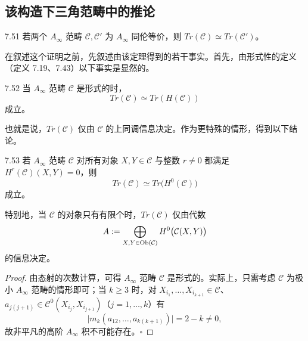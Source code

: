 
\subsection{该构造下三角范畴中的推论}

\begin{theorem}{7.51}
若两个 $A_\infty$ 范畴 $\mathcal C,\mathcal C'$ 为 $A_\infty$ 同伦等价，则 $Tr(\mathcal C)\simeq Tr(\mathcal C')$。
\end{theorem}

在叙述这个证明之前，先叙述由该定理得到的若干事实。首先，由形式性的定义（定义 7.19、7.43）以下事实是显然的。

\begin{corollary}{7.52}
当 $A_\infty$ 范畴 $\mathcal C$ 是形式的时，
\[
  Tr(\mathcal C)\simeq Tr(H(\mathcal C))
\]
成立。
\end{corollary}

也就是说，$Tr(\mathcal C)$ 仅由 $\mathcal C$ 的上同调信息决定。作为更特殊的情形，得到以下结论。

\begin{corollary}{7.53}
若 $A_\infty$ 范畴 $\mathcal C$ 对所有对象 $X,Y\in\mathcal C$ 与整数 $r\ne 0$ 都满足 $H^{r}(\mathcal C)(X,Y)=0$，则
\[
  Tr(\mathcal C)\simeq Tr\bigl(H^{0}(\mathcal C)\bigr)
\]
成立。
\end{corollary}


特别地，当 $\mathcal C$ 的对象只有有限个时，$Tr(\mathcal C)$ 仅由代数
\[
  A:=\bigoplus_{X,Y\in\operatorname{Ob}(\mathcal C)}H^{0}\bigl(\mathcal C(X,Y)\bigr)
\]
的信息决定。

\begin{proof}
由态射的次数计算，可得 $A_\infty$ 范畴 $\mathcal C$ 是形式的。实际上，只需考虑 $\mathcal C$ 为极小 $A_\infty$ 范畴的情形即可；当 $k\ge 3$ 时，对 $X_{i_{1}},\dots,X_{i_{k+1}}\in\mathcal C$、$a_{j(j+1)}\in\mathcal C^{0}(X_{i_{j}},X_{i_{j+1}})$（$j=1,\dots,k$）有
\[
  \bigl|m_{k}(a_{12},\dots,a_{k(k+1)})\bigr|=2-k\ne 0,
\]
故非平凡的高阶 $A_\infty$ 积不可能存在。\hfill$\square$
\end{proof}

